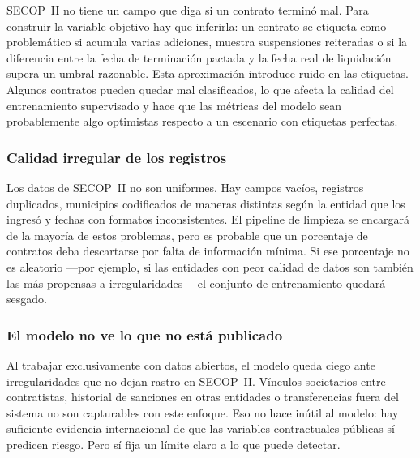 SECOP~II no tiene un campo que diga si un contrato terminó mal. Para construir
la variable objetivo hay que inferirla: un contrato se etiqueta como problemático
si acumula varias adiciones, muestra suspensiones reiteradas o si la diferencia
entre la fecha de terminación pactada y la fecha real de liquidación supera un
umbral razonable. Esta aproximación introduce ruido en las etiquetas. Algunos
contratos pueden quedar mal clasificados, lo que afecta la calidad del
entrenamiento supervisado y hace que las métricas del modelo sean probablemente
algo optimistas respecto a un escenario con etiquetas perfectas.

\subsubsection{Calidad irregular de los registros}

Los datos de SECOP~II no son uniformes. Hay campos vacíos, registros duplicados,
municipios codificados de maneras distintas según la entidad que los ingresó y
fechas con formatos inconsistentes. El pipeline de limpieza se encargará de la
mayoría de estos problemas, pero es probable que un porcentaje de contratos deba
descartarse por falta de información mínima. Si ese porcentaje no es aleatorio
---por ejemplo, si las entidades con peor calidad de datos son también las más
propensas a irregularidades--- el conjunto de entrenamiento quedará sesgado.

\subsubsection{El modelo no ve lo que no está publicado}

Al trabajar exclusivamente con datos abiertos, el modelo queda ciego ante
irregularidades que no dejan rastro en SECOP~II. Vínculos societarios entre
contratistas, historial de sanciones en otras entidades o transferencias fuera
del sistema no son capturables con este enfoque. Eso no hace inútil al modelo:
hay suficiente evidencia internacional de que las variables contractuales públicas
sí predicen riesgo. Pero sí fija un límite claro a lo que puede detectar.